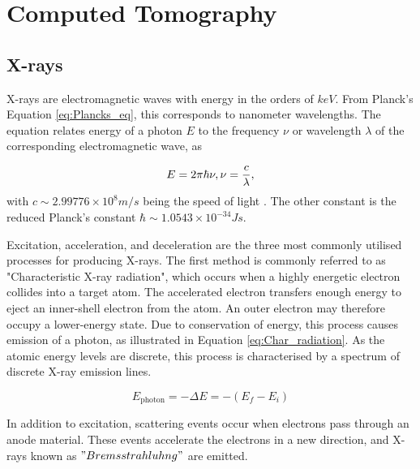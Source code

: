 
\chapter{Computed Tomography}

\section{X-rays}
X-rays are electromagnetic waves with energy in the orders of $keV$. From Planck's Equation \eqref{eq:Plancks_eq}, this corresponds to nanometer wavelengths. The equation relates energy of a photon $E$ to the frequency $\nu$ or wavelength $\lambda$ of the corresponding electromagnetic wave, as

\begin{equation}\label{eq:Plancks_eq}
    E = 2\pi \hbar \nu, \newline
    
    \nu = \frac{c}{\lambda},
\end{equation}
\noindent
with $c \sim 2.99776 \times 10^8 m/s$ being the speed of light \cite{blokhin1961physics}. The other constant is the reduced Planck's constant $\hbar \sim 1.0543 \times 10^{-34} Js$. 

Excitation, acceleration, and deceleration are the three most commonly utilised processes for producing X-rays. The first method is commonly referred to as "Characteristic X-ray radiation", which occurs when a highly energetic electron collides into a target atom. The accelerated electron transfers enough energy to eject an inner-shell electron from the atom. An outer electron may therefore occupy a lower-energy state. Due to conservation of energy, this process causes emission of a photon, as illustrated in Equation \eqref{eq:Char_radiation}. As the atomic energy levels are discrete, this process is characterised by a spectrum of discrete X-ray emission lines.

\begin{equation}\label{eq:Char_radiation}
    E_{\mathrm{photon}} = - \Delta E = - (E_f - E_i)
\end{equation}

In addition to excitation, scattering events occur when electrons pass through an anode material. These events accelerate the electrons in a new direction, and X-rays known as $"Bremsstrahluhng"$ are emitted. %

